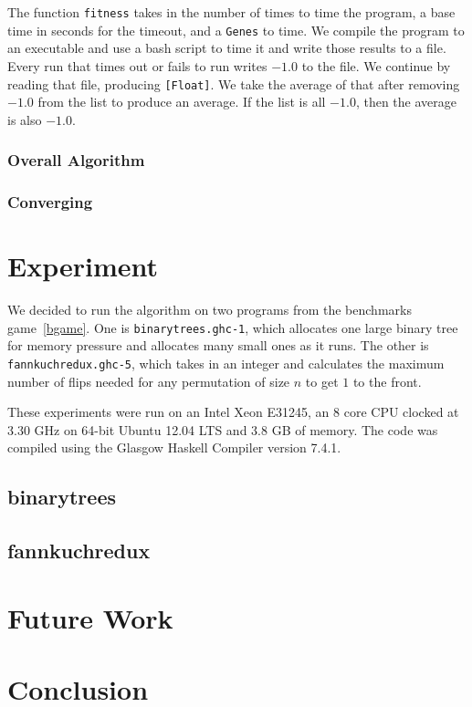 \documentclass{sigplanconf}
\begin{document}
The function \lstinline!fitness! takes in the number of times to time the program, a base time in seconds for the timeout, and a \lstinline!Genes! to time. We compile the program to an executable and use a bash script to time it and write those results to a file. Every run that times out or fails to run writes $-1.0$ to the file. We continue by reading that file, producing \lstinline![Float]!. We take the average of that after removing $-1.0$ from the list to produce an average. If the list is all $-1.0$, then the average is also $-1.0$.
\subsubsection{Overall Algorithm}

\subsubsection{Converging}

\section{Experiment}\label{sec:expr}
We decided to run the algorithm on two programs from the benchmarks game~\ref{bgame}. One is \lstinline!binarytrees.ghc-1!, which allocates one large binary tree for memory pressure and allocates many small ones as it runs. The other is \lstinline!fannkuchredux.ghc-5!, which takes in an integer and calculates the maximum number of flips needed for any permutation of size $n$ to get $1$ to the front.

These experiments were run on an Intel Xeon E31245, an 8 core CPU clocked at 3.30 GHz on 64-bit Ubuntu 12.04 LTS and 3.8 GB of memory. The code was compiled using the Glasgow Haskell Compiler version 7.4.1.
\subsection{binarytrees}
\subsection{fannkuchredux}

\section{Future Work}\label{sec:futr}

\section{Conclusion}\label{sec:conc}
\end{document}
